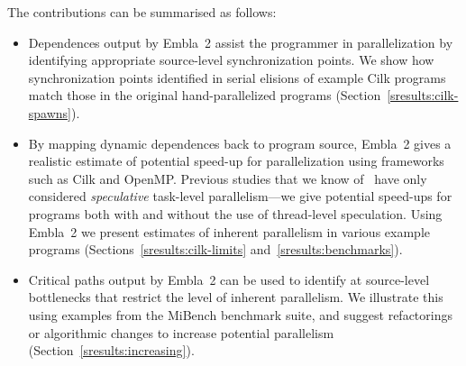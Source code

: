 The contributions can be summarised as follows:
\begin{itemize}
\item
Dependences output by Embla~2 assist the programmer in 
parallelization by identifying
appropriate source-level synchronization points. We show how synchronization
points identified in serial elisions of example Cilk programs
match those in the original hand-parallelized programs (Section~\ref{sresults:cilk-spawns}).
\item
By mapping dynamic dependences back to program source,
Embla~2 gives a realistic estimate of potential speed-up for
parallelization using frameworks such as Cilk and OpenMP.
Previous studies that we know of~\cite{Kreaseck00limitsof,warg01limits,oplinger99insearch}
have only considered \emph{speculative}
task-level parallelism---we give potential speed-ups for programs
both with and without the use of thread-level speculation.
Using Embla~2 we present estimates of inherent parallelism in
various example programs (Sections~\ref{sresults:cilk-limits} and~\ref{sresults:benchmarks}).
\item
Critical paths output by Embla~2 can
be used to identify at source-level bottlenecks that restrict the level of
inherent parallelism. We illustrate this using examples
from the MiBench benchmark suite, and suggest refactorings
or algorithmic changes to increase potential parallelism (Section~\ref{sresults:increasing}).
\end{itemize}
